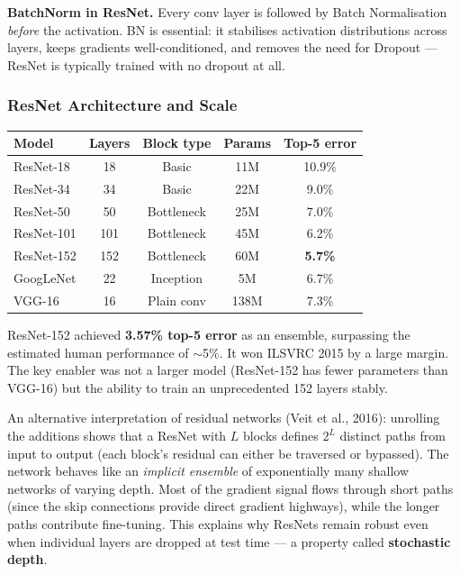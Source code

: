 \documentclass[11pt,a4paper]{article}
\newcommand{\term}[1]{\textcolor{DefGreen}{\textbf{#1}}\index{#1}}
\begin{document}
\textbf{BatchNorm in ResNet.}  Every conv layer is followed by Batch Normalisation \emph{before}
the activation.  BN is essential: it stabilises activation distributions across layers,
keeps gradients well-conditioned, and removes the need for Dropout — ResNet is typically
trained with no dropout at all.

\subsubsection{ResNet Architecture and Scale}

\begin{center}
\renewcommand{\arraystretch}{1.25}
\begin{tabular}{@{}lcccc@{}}
\toprule
\textbf{Model} & \textbf{Layers} & \textbf{Block type} & \textbf{Params} & \textbf{Top-5 error} \\
\midrule
ResNet-18  & 18  & Basic       & 11M  & 10.9\% \\
ResNet-34  & 34  & Basic       & 22M  & 9.0\%  \\
ResNet-50  & 50  & Bottleneck  & 25M  & 7.0\%  \\
ResNet-101 & 101 & Bottleneck  & 45M  & 6.2\%  \\
ResNet-152 & 152 & Bottleneck  & 60M  & \textbf{5.7\%}  \\
\midrule
GoogLeNet  & 22  & Inception   & 5M   & 6.7\%  \\
VGG-16     & 16  & Plain conv  & 138M & 7.3\%  \\
\bottomrule
\end{tabular}
\end{center}

ResNet-152 achieved \textbf{3.57\% top-5 error} as an ensemble, surpassing the estimated human
performance of $\sim$5\%.  It won ILSVRC 2015 by a large margin.  The key enabler was not
a larger model (ResNet-152 has fewer parameters than VGG-16) but the ability to train
an unprecedented 152 layers stably.

\begin{insightbox}
An alternative interpretation of residual networks (Veit et al., 2016): unrolling the
additions shows that a ResNet with $L$ blocks defines $2^L$ distinct paths from input to
output (each block's residual can either be traversed or bypassed).  The network behaves
like an \emph{implicit ensemble} of exponentially many shallow networks of varying depth.
Most of the gradient signal flows through short paths (since the skip connections provide
direct gradient highways), while the longer paths contribute fine-tuning.  This explains
why ResNets remain robust even when individual layers are dropped at test time — a property
called \term{stochastic depth}.
\end{insightbox}
\end{document}
